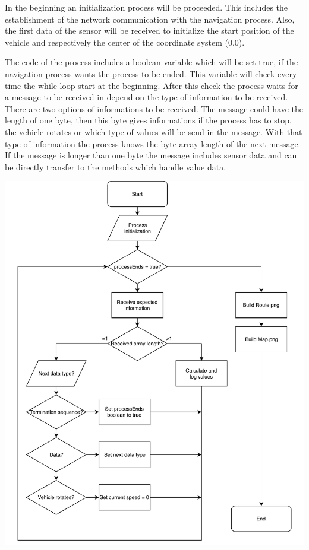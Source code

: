 In the beginning an initialization process will be proceeded. This includes the establishment of the network communication with the navigation process. Also, the first data of the sensor will be received to initialize the start position of the vehicle and respectively the center of the coordinate system (0,0).\\


\begin{minipage}{0.4\textwidth}
The code of the process includes a boolean variable which will be set true, if the navigation process wants the process to be ended. This variable will check every time the while-loop start at the beginning. After this check the process waits for a message to be received in depend on the type of information to be received.\\
There are two options of informations to be received. The message could have the length of one byte, then this byte gives informations if the process has to stop, the vehicle rotates or which type of values will be send in the message. With that type of information the process knows the byte array length of the next message. \\
If the message is longer than one byte the message includes sensor data and can be directly transfer to the methods which handle value data.\\
\end{minipage}
\begin{minipage}{0.6\textwidth}
\label{programSequence}
\begin{center}
	\includegraphics[scale=0.6]{sources/mapping/program_sequence.pdf}
\end{center}
\end{minipage}

